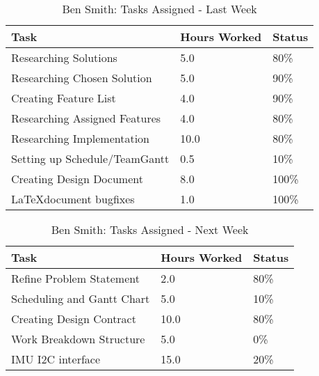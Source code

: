 \documentclass[12pt,article,compsoc]{IEEEtran}
\begin{document}
	\begin{table}[ht]
	\renewcommand{\arraystretch}{1.3}
		\caption{Ben Smith: Tasks Assigned - Last Week}
		
		\label{Summary of Ben Smith's activities: last week}
		
		\centering
		\begin{tabular}{p{5.5cm}|p{1cm}|p{1cm}}

		\hline
		\bfseries 		Task				            	& \bfseries Hours Worked		& \bfseries Status	\\
		\hline\hline
					Researching Solutions    				& 5.0							& 80\%				\\
					Researching Chosen Solution				& 5.0							& 90\%				\\
					Creating Feature List					& 4.0							& 90\%				\\
                    Researching Assigned Features           & 4.0                           & 80\%              \\
                    Researching Implementation				& 10.0	    					& 80\%				\\
					Setting up Schedule/TeamGantt			& 0.5							& 10\%				\\
					Creating Design Document				& 8.0							& 100\%				\\
                    \LaTeX document bugfixes                & 1.0                           & 100\%             \\
		\hline
		\end{tabular}
	\end{table}

	\begin{table}[ht]
	\renewcommand{\arraystretch}{1.3}
		\caption{Ben Smith: Tasks Assigned - Next Week}
		
		\label{Summary of Ben Smith's activites: this week}
		
		\centering
		\begin{tabular}{p{5.5cm}|p{1cm}|p{1cm}}

		\hline
		\bfseries 	Task	            	 		& \bfseries Hours Worked	& \bfseries Status	\\
		\hline\hline
					Refine Problem Statement		& 2.0						& 80\%				\\
					Scheduling and Gantt Chart	    & 5.0						& 10\%				\\
                    Creating Design Contract        & 10.0                      & 80\%             \\
                    Work Breakdown Structure        & 5.0                       & 0\%             \\
                    IMU I2C interface               & 15.0                      & 20\%              \\
		\hline
		\end{tabular}
	\end{table}

\end{document}
